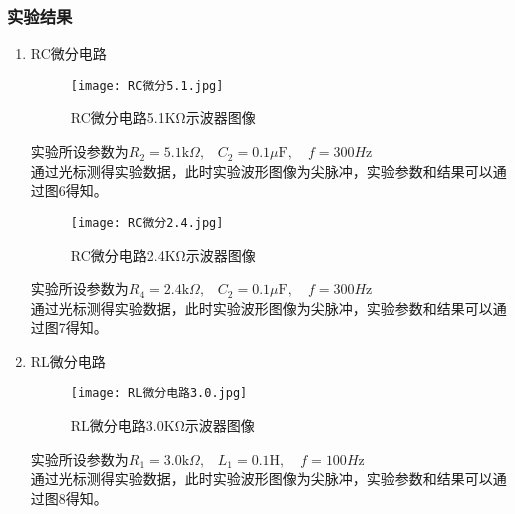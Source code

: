 \documentclass[dvipsnames, svgnames,a4paper,11pt]{article}
\begin{document}
	\subsubsection{实验结果}
	\begin{enumerate}
\item RC微分电路
\begin{figure}[{H}]
	\centering
	\texttt{[image: RC微分5.1.jpg]}
	\caption{RC微分电路5.1KΩ示波器图像}
	\label{}
\end{figure}
实验所设参数为$R_2=5.1\text{k}\Omega\text{,}\quad C_2=0.1\mu\text{F}, \quad f=300H\text{z}$\\
\indent 通过光标测得实验数据，此时实验波形图像为尖脉冲，实验参数和结果可以通过图6得知。

\begin{figure}[{H}]
	\centering
	\texttt{[image: RC微分2.4.jpg]}
	\caption{RC微分电路2.4KΩ示波器图像}
	\label{}
\end{figure}
实验所设参数为$R_4=2.4\text{k}\Omega\text{,}\quad C_2=0.1\mu\text{F},\quad f=300H\text{z}$\\
\indent 通过光标测得实验数据，此时实验波形图像为尖脉冲，实验参数和结果可以通过图7得知。
\item RL微分电路
\begin{figure}[{H}]
	\centering
	\texttt{[image: RL微分电路3.0.jpg]}
	\caption{RL微分电路3.0KΩ示波器图像}
	\label{}
\end{figure}
实验所设参数为$R_1=3.0\text{k}\Omega\text{,}\quad L_1=0.1\text{H},\quad f=100H\text{z}$\\
\indent 通过光标测得实验数据，此时实验波形图像为尖脉冲，实验参数和结果可以通过图8得知。


\end{enumerate}
\end{document}
